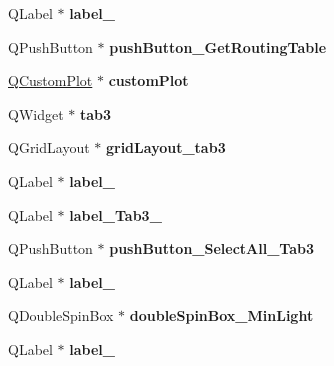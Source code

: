 \begin{DoxyCompactItemize}
Q\+Label $\ast$ {\bfseries label\+\_}
\item 
\mbox{\label{classUi__MainWindow_a0aaf8d331b5083b1a2ba1f0fd54f91c9}} 
Q\+Push\+Button $\ast$ {\bfseries push\+Button\+\_\+\+Get\+Routing\+Table}
\item 
\mbox{\label{classUi__MainWindow_a1e91de1cfe5e44c392cc587158177e7b}} 
\hyperlink{classQCustomPlot}{Q\+Custom\+Plot} $\ast$ {\bfseries custom\+Plot}
\item 
\mbox{\label{classUi__MainWindow_a05d8dc8b79bc2816b9097b2bfe854408}} 
Q\+Widget $\ast$ {\bfseries tab3}
\item 
\mbox{\label{classUi__MainWindow_a81b842cfdbd1e87364562bb3976ed55e}} 
Q\+Grid\+Layout $\ast$ {\bfseries grid\+Layout\+\_\+tab3}
\item 
\mbox{\label{classUi__MainWindow_a0376fd90247280e7c7957cc70628708c}} 
Q\+Label $\ast$ {\bfseries label\+\_}
\item 
\mbox{\label{classUi__MainWindow_a7b2cf33438674072675125c7f1dbcb51}} 
Q\+Label $\ast$ {\bfseries label\+\_\+\+Tab3\+\_}
\item 
\mbox{\label{classUi__MainWindow_aa74bc9bb19b65f9768cb6c61e5fc39c8}} 
Q\+Push\+Button $\ast$ {\bfseries push\+Button\+\_\+\+Select\+All\+\_\+\+Tab3}
\item 
\mbox{\label{classUi__MainWindow_a13936e6f18b1c90402b3c7a3c92b6cdb}} 
Q\+Label $\ast$ {\bfseries label\+\_}
\item 
\mbox{\label{classUi__MainWindow_a8d08b67556ceee92c2bd23adca30a3a0}} 
Q\+Double\+Spin\+Box $\ast$ {\bfseries double\+Spin\+Box\+\_\+\+Min\+Light}
\item 
\mbox{\label{classUi__MainWindow_a663f728e6244926a795c6e6892673b1d}} 
Q\+Label $\ast$ {\bfseries label\+\_}
\item 
\mbox{\label{classUi__MainWindow_af6d3c923f885bbc401e396f1db40a9c1}} 

\end{DoxyCompactItemize}
